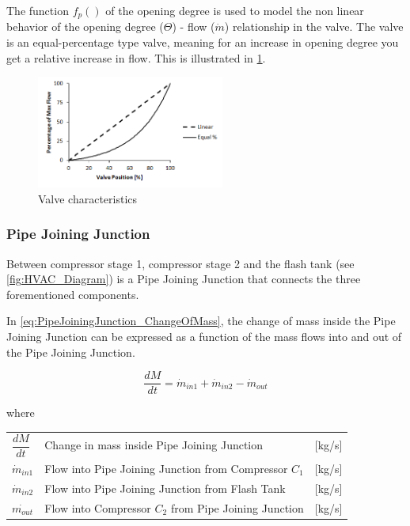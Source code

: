 The function $f_p()$ of the opening degree is used to model the non linear behavior of the opening degree ($ \Theta $) - flow ($ \dot{m} $) relationship in the valve. The valve is an equal-percentage type valve, meaning for an increase in opening degree you get a relative increase in flow. This is illustrated in \cref{fig:equal_percent_valve}.

\begin{figure}[h!]
	\centering
	\includegraphics[width=0.55\textwidth]{Graphics/Equal-percentage.png}
	\caption{Valve characteristics}
	\label{fig:equal_percent_valve}
\end{figure}


\subsubsection{Pipe Joining Junction}
Between compressor stage 1, compressor stage 2 and the flash tank (see \cref{fig:HVAC_Diagram}) is a Pipe Joining Junction that connects the three forementioned components.

In \cref{eq:PipeJoiningJunction_ChangeOfMass}, the change of mass inside the Pipe Joining Junction can be expressed as a function of the mass flows into and out of the Pipe Joining Junction.

\begin{equation} \label{eq:PipeJoiningJunction_ChangeOfMass}
	\frac{dM}{dt} = \dot{m}_{in1} + \dot{m}_{in2} - \dot{m}_{out}
\end{equation}


where

\begin{center}
	\begin{tabular}{l p{8cm} l}
		$\dfrac{dM}{dt}$ & Change in mass inside Pipe Joining Junction             & [\si{kg}/\si{s}] \\
		$\dot{m}_{in1}$  & Flow into Pipe Joining Junction from Compressor $ C_1 $ & [\si{kg}/\si{s}] \\
		$\dot{m}_{in2}$  & Flow into Pipe Joining Junction from Flash Tank         & [\si{kg}/\si{s}] \\
		$\dot{m_{out}}$  & Flow into Compressor $ C_2 $ from Pipe Joining Junction & [\si{kg}/\si{s}]
	\end{tabular}
\end{center}

